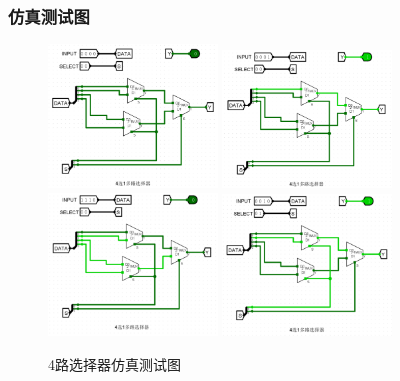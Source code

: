 \documentclass{article}
\begin{document}
    \subsubsection{仿真测试图}
    \begin{figure}[H]
    \centering
    \includegraphics[width=0.4\textwidth]{7.5.1.png}
    \includegraphics[width=0.4\textwidth]{7.5.2.png}
    \includegraphics[width=0.4\textwidth]{7.5.3.png}
    \includegraphics[width=0.4\textwidth]{7.5.4.png}
    \caption{4路选择器仿真测试图}
    \end{figure}
\end{document}
